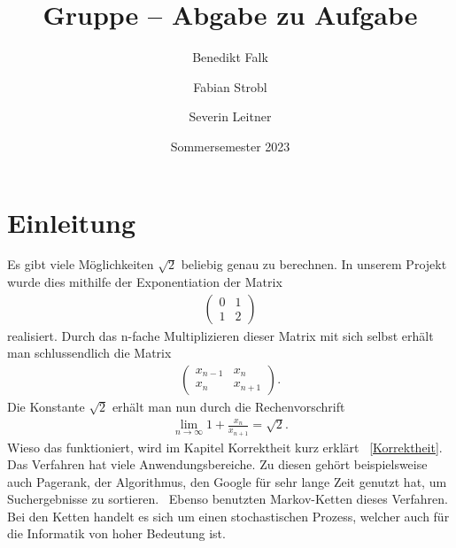\documentclass[course=erap]{aspdoc}
\author{Benedikt Falk \and Fabian Strobl \and Severin Leitner}
\date{Sommersemester 2023} %
\title{Gruppe \theGroup{} -- Abgabe zu Aufgabe \theNumber}
\begin{document}
    \maketitle

    \section{Einleitung}

    Es gibt viele Möglichkeiten \begin{math}\sqrt{2}\end{math} beliebig genau zu berechnen. In unserem Projekt wurde dies mithilfe der Exponentiation der Matrix \begin{align}
                                                                                                                                                                     \begin{pmatrix}
                                                                                                                                                                         0 & 1\\
                                                                                                                                                                         1 & 2
                                                                                                                                                                     \end{pmatrix}
    \end{align}
    realisiert. Durch das n-fache Multiplizieren dieser Matrix mit sich selbst erhält man schlussendlich die Matrix
    \begin{align}
        \begin{pmatrix}
            x_{n-1} & x_n \\
            x_n  & x_{n+1}
        \end{pmatrix}. \end{align}  Die Konstante \begin{math} \sqrt{2} \end{math} erhält man nun durch die Rechenvorschrift
    \begin{align}
        \lim\limits_{n \to \infty} 1 + \frac{x_n}{x_{n+1}} = \sqrt{2}.
    \end{align}
    Wieso das funktioniert, wird im Kapitel \glqq Korrektheit \grqq\space kurz erklärt ~\ref{Korrektheit}. Das Verfahren hat viele Anwendungsbereiche. Zu diesen gehört beispielsweise auch Pagerank, der Algorithmus, den Google für sehr lange Zeit genutzt hat, um Suchergebnisse zu sortieren.~\cite{pagerank} Ebenso benutzten Markov-Ketten dieses Verfahren. Bei den Ketten handelt es sich um einen stochastischen Prozess, welcher auch für die Informatik von hoher Bedeutung ist.
\end{document}
